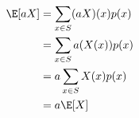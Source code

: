 
\begin{align*}
\E[aX]
&= \sum_{x \in S} (aX)(x) p(x) \\
&= \sum_{x \in S} a(X(x)) p(x) \\
&= a \sum_{x \in S} X(x) p(x) \\
&= a \E[X]
\end{align*}
    
